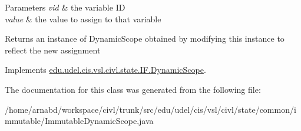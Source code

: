 \begin{DoxyParams}{Parameters}
{\em vid} & the variable I\+D \\
\hline
{\em value} & the value to assign to that variable \\
\hline
\end{DoxyParams}
\begin{DoxyReturn}{Returns}
an instance of Dynamic\+Scope obtained by modifying this instance to reflect the new assignment 
\end{DoxyReturn}


Implements \hyperlink{interfaceedu_1_1udel_1_1cis_1_1vsl_1_1civl_1_1state_1_1IF_1_1DynamicScope_a4ec67e84183f3744e68193ac348d8be5}{edu.\+udel.\+cis.\+vsl.\+civl.\+state.\+I\+F.\+Dynamic\+Scope}.



The documentation for this class was generated from the following file\+:\begin{DoxyCompactItemize}
\item 
/home/arnabd/workspace/civl/trunk/src/edu/udel/cis/vsl/civl/state/common/immutable/Immutable\+Dynamic\+Scope.\+java\end{DoxyCompactItemize}
